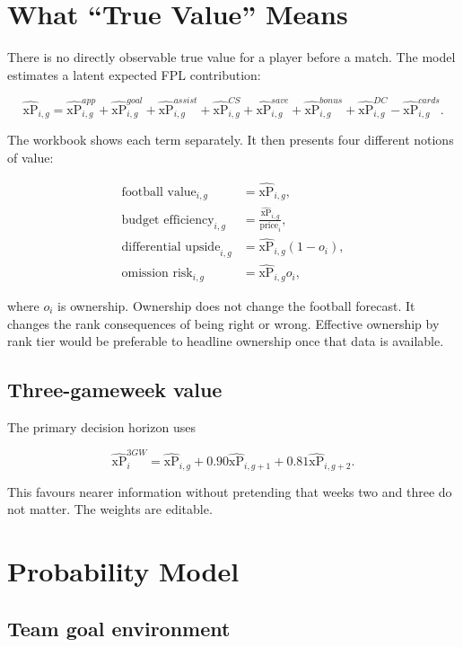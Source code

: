 \documentclass[11pt,a4paper]{article}
\newcommand{\xp}{\widehat{\mathrm{xP}}}
\begin{document}
\section{What ``True Value'' Means}

There is no directly observable true value for a player before a match. The model estimates a latent expected FPL contribution:

\begin{equation}
\xp_{i,g}
= \xp^{app}_{i,g}
+ \xp^{goal}_{i,g}
+ \xp^{assist}_{i,g}
+ \xp^{CS}_{i,g}
+ \xp^{save}_{i,g}
+ \xp^{bonus}_{i,g}
+ \xp^{DC}_{i,g}
- \xp^{cards}_{i,g}.
\end{equation}

The workbook shows each term separately. It then presents four different notions of value:

\begin{align}
\text{football value}_{i,g} &= \xp_{i,g},\\
\text{budget efficiency}_{i,g} &= \frac{\xp_{i,g}}{\text{price}_{i}},\\
\text{differential upside}_{i,g} &= \xp_{i,g}(1-o_i),\\
\text{omission risk}_{i,g} &= \xp_{i,g}o_i,
\end{align}

where $o_i$ is ownership. Ownership does not change the football forecast. It changes the rank consequences of being right or wrong. Effective ownership by rank tier would be preferable to headline ownership once that data is available.

\subsection{Three-gameweek value}

The primary decision horizon uses

\begin{equation}
\xp^{3GW}_i = \xp_{i,g}+0.90\xp_{i,g+1}+0.81\xp_{i,g+2}.
\end{equation}

This favours nearer information without pretending that weeks two and three do not matter. The weights are editable.

\section{Probability Model}

\subsection{Team goal environment}
\end{document}
